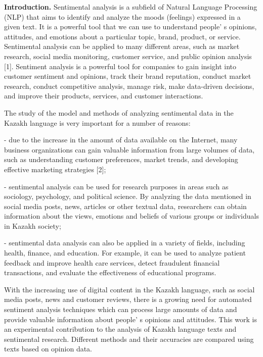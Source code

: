 \begin{multicols}{2}
{\bfseries Introduction.} Sentimental analysis is a subfield of Natural
Language Processing (NLP) that aims to identify and analyze the moods
(feelings) expressed in a given text. It is a powerful tool that we can
use to understand people' s opinions, attitudes, and
emotions about a particular topic, brand, product, or service.
Sentimental analysis can be applied to many different areas, such as
market research, social media monitoring, customer service, and public
opinion analysis {[}1{]}. Sentiment analysis is a powerful tool for
companies to gain insight into customer sentiment and opinions, track
their brand reputation, conduct market research, conduct competitive
analysis, manage risk, make data-driven decisions, and improve their
products, services, and customer interactions.

The study of the model and methods of analyzing sentimental data in the
Kazakh language is very important for a number of reasons:

- due to the increase in the amount of data available on the Internet,
many business organizations can gain valuable information from large
volumes of data, such as understanding customer preferences, market
trends, and developing effective marketing strategies {[}2{]};

- sentimental analysis can be used for research purposes in areas such
as sociology, psychology, and political science. By analyzing the data
mentioned in social media posts, news, articles or other textual data,
researchers can obtain information about the views, emotions and beliefs
of various groups or individuals in Kazakh society;

- sentimental data analysis can also be applied in a variety of fields,
including health, finance, and education. For example, it can be used to
analyze patient feedback and improve health care services, detect
fraudulent financial transactions, and evaluate the effectiveness of
educational programs.

With the increasing use of digital content in the Kazakh language, such
as social media posts, news and customer reviews, there is a growing
need for automated sentiment analysis techniques which can process large
amounts of data and provide valuable information about
people' s opinions and attitudes. This work is an
experimental contribution to the analysis of Kazakh language texts and
sentimental research. Different methods and their accuracies are
compared using texts based on opinion data.


\end{multicols}
